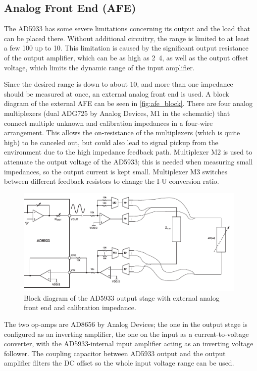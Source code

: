 \subsection{Analog Front End (AFE)}

The AD5933 has some severe limitations concerning its output and the load that can be placed there. Without additional
circuitry, the range is limited to at least a few \unit{100}{\kilo\ohm} up to \unit{10}{\mega\ohm}.
This limitation is caused by the significant output resistance of the output amplifier, which can be as high as
\unit{2.4}{\kilo\ohm}, as well as the output offset voltage, which limits the dynamic range of the input amplifier.

Since the desired range is down to about \unit{10}{\ohm}, and more than one impedance should be measured at once,
an external analog front end is used.
A block diagram of the external AFE can be seen in \autoref{fig:afe_block}.
There are four analog multiplexers (dual ADG725 by Analog Devices, M1 in the schematic) that connect multiple unknown
and calibration impedances in a four-wire arrangement. This allows the on-resistance of the multiplexers (which is
quite high) to be canceled out, but could also lead to signal pickup from the environment due to the high impedance
feedback path.
Multiplexer M2 is used to attenuate the output voltage of the AD5933; this is needed when measuring small impedances,
so the output current is kept small.
Multiplexer M3 switches between different feedback resistors to change the I-U conversion ratio.

\begin{figure}[hpb]
  \centering
    \includegraphics[width=\textwidth]{bilder/afe_block.pdf}
  \caption{Block diagram of the AD5933 output stage with external analog front end and calibration impedance.}
  \label{fig:afe_block}
\end{figure}

The two op-amps are AD8656 by Analog Devices; the one in the output stage is configured as an inverting amplifier,
the one on the input as a current-to-voltage converter, with the AD5933-internal input amplifier acting as an inverting
voltage follower. The coupling capacitor between AD5933 output and the output amplifier filters the DC offset so the
whole input voltage range can be used.

